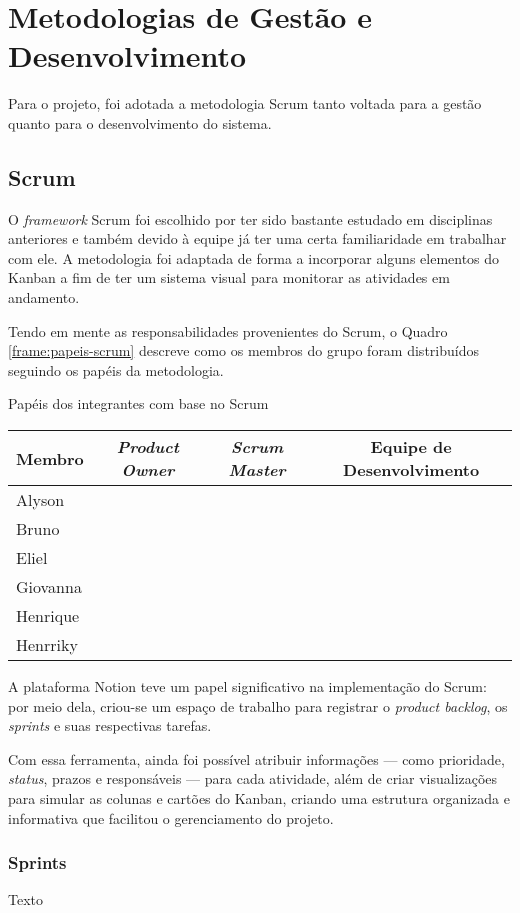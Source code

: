 \section{Metodologias de Gestão e Desenvolvimento}

Para o projeto, foi adotada a metodologia Scrum \cite{Scrum} tanto voltada para a gestão quanto para o desenvolvimento do sistema.

\subsection{Scrum}

O \textit{framework} Scrum foi escolhido por ter sido bastante estudado em disciplinas anteriores e também devido à equipe já ter uma certa familiaridade em trabalhar com ele. A metodologia foi adaptada de forma a incorporar alguns elementos do Kanban \cite{Kanban} a fim de ter um sistema visual para monitorar as atividades em andamento.

Tendo em mente as responsabilidades provenientes do Scrum, o Quadro \ref{frame:papeis-scrum} descreve como os membros do grupo foram distribuídos seguindo os papéis da metodologia.

\begin{quadro}[ht]
	\setlength{\tabcolsep}{3pt}
	\begin{center}
		\caption{\label{frame:papeis-scrum}Papéis dos integrantes com base no Scrum}
		\begin{tabular}{|l|c|c|c|}
			\hline
			\textbf{Membro} & \textbf{\textit{Product Owner}} & \textbf{\textit{Scrum Master}} & \textbf{Equipe de Desenvolvimento} \\
			\hline
			Alyson &  & \checkmark & \checkmark \\
			\hline
			Bruno &  &  & \checkmark \\
			\hline
			Eliel &  &  & \checkmark \\
			\hline
			Giovanna &  &  & \checkmark \\
			\hline
			Henrique &  &  & \checkmark \\
			\hline
			Henrriky & \checkmark &  & \checkmark \\
			\hline
		\end{tabular}
	\end{center}
\end{quadro}

A plataforma Notion \cite{Notion} teve um papel significativo na implementação do Scrum: por meio dela, criou-se um espaço de trabalho para registrar o \textit{product backlog}, os \textit{sprints} e suas respectivas tarefas.

Com essa ferramenta, ainda foi possível atribuir informações --- como prioridade, \textit{status}, prazos e responsáveis --- para cada atividade, além de criar visualizações para simular as colunas e cartões do Kanban, criando uma estrutura organizada e informativa que facilitou o gerenciamento do projeto.

\subsubsection{Sprints}

Texto